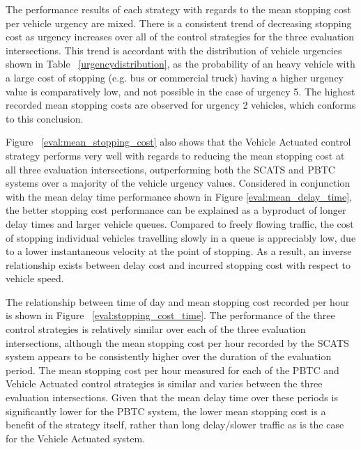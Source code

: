 The performance results of each strategy with regards to the mean stopping cost per vehicle urgency are mixed. There is a consistent trend of decreasing stopping cost as urgency increases over all of the control strategies for the three evaluation intersections. This trend is accordant with the distribution of vehicle urgencies shown in Table ~\ref{urgencydistribution}, as the probability of an heavy vehicle with a large cost of stopping (e.g. bus or commercial truck) having a higher urgency value is comparatively low, and not possible in the case of urgency 5. The highest recorded mean stopping costs are observed for urgency 2 vehicles, which conforms to this conclusion. %

Figure ~\ref{eval:mean_stopping_cost} also shows that the Vehicle Actuated control strategy performs very well with regards to reducing the mean stopping cost at all three evaluation intersections, outperforming both the SCATS and PBTC systems over a majority of the vehicle urgency values. Considered in conjunction with the mean delay time performance shown in Figure \ref{eval:mean_delay_time}, the better stopping cost performance can be explained as a byproduct of longer delay times and larger vehicle queues. Compared to freely flowing traffic, the cost of stopping individual vehicles travelling slowly in a queue is appreciably low, due to a lower instantaneous velocity at the point of stopping. As a result, an inverse relationship exists between delay cost and incurred stopping cost with respect to vehicle speed. %

The relationship between time of day and mean stopping cost recorded per hour is shown in Figure ~\ref{eval:stopping_cost_time}. The performance of the three control strategies is relatively similar over each of the three evaluation intersections, although the mean stopping cost per hour recorded by the SCATS system appears to be consistently higher over the duration of the evaluation period. The mean stopping cost per hour measured for each of the PBTC and Vehicle Actuated control strategies is similar and varies between the three evaluation intersections. Given that the mean delay time over these periods is significantly lower for the PBTC system, the lower mean stopping cost is a benefit of the strategy itself, rather than long delay/slower traffic as is the case for the Vehicle Actuated system.

